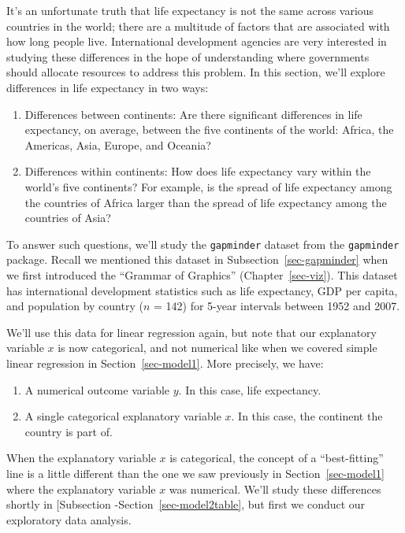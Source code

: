 \documentclass[
  letterpaper,
  DIV=11,
  numbers=noendperiod]{scrreprt}
\theoremstyle{definition}
\theoremstyle{remark}
\begin{document}
It's an unfortunate truth that life expectancy is not the same across
various countries in the world; there are a multitude of factors that
are associated with how long people live. International development
agencies are very interested in studying these differences in the hope
of understanding where governments should allocate resources to address
this problem. In this section, we'll explore differences in life
expectancy in two ways:

\begin{enumerate}
\def\labelenumi{\arabic{enumi}.}
\item
  Differences between continents: Are there significant differences in
  life expectancy, on average, between the five continents of the world:
  Africa, the Americas, Asia, Europe, and Oceania?
\item
  Differences within continents: How does life expectancy vary within
  the world's five continents? For example, is the spread of life
  expectancy among the countries of Africa larger than the spread of
  life expectancy among the countries of Asia?
\end{enumerate}

To answer such questions, we'll study the \texttt{gapminder} dataset
from the \texttt{gapminder} package. Recall we mentioned this dataset in
Subsection~\ref{sec-gapminder} when we first introduced the ``Grammar of
Graphics'' (Chapter~\ref{sec-viz}). This dataset has international
development statistics such as life expectancy, GDP per capita, and
population by country (\(n\) = 142) for 5-year intervals between 1952
and 2007.

We'll use this data for linear regression again, but note that our
explanatory variable \(x\) is now categorical, and not numerical like
when we covered simple linear regression in Section~\ref{sec-model1}.
More precisely, we have:

\begin{enumerate}
\def\labelenumi{\arabic{enumi}.}
\item
  A numerical outcome variable \(y\). In this case, life expectancy.
\item
  A single categorical explanatory variable \(x\). In this case, the
  continent the country is part of.
\end{enumerate}

When the explanatory variable \(x\) is categorical, the concept of a
``best-fitting'' line is a little different than the one we saw
previously in Section~\ref{sec-model1} where the explanatory variable
\(x\) was numerical. We'll study these differences shortly in
{[}Subsection -Section~\ref{sec-model2table}, but first we conduct our
exploratory data analysis.
\end{document}
